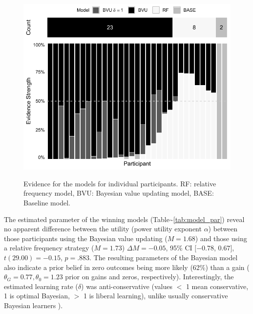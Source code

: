 \documentclass[a4paper, man, floatsintext]{apa6}
\begin{document}
\begin{figure}

{\centering \includegraphics{figures/model_weights-1}
}

\caption{Evidence for the models for individual participants. RF: relative frequency model, BVU: Bayesian value updating model, BASE: Baseline model.}\label{fig:model_weights}
\end{figure}

The estimated parameter of the winning models
(Table\textasciitilde{}\ref{tab:model_par}) reveal no apparent
difference between the utility (power utility exponent \(\alpha\))
between those participants using the Bayesian value updating
(\(M=1.68\)) and those using a relative frequency strategy (\(M=1.73\))
\(\Delta M = -0.05\), 95\% CI \([-0.78\), \(0.67]\),
\(t(29.00) = -0.15\), \(p = .883\). The resulting parameters of the
Bayesian model also indicate a prior belief in zero outcomes being more
likely (62\%) than a gain (\(\theta_G = 0.77, \theta_0 = 1.23\) prior on
gains and zeros, respectively). Interestingly, the estimated learning
rate (\(\delta\)) was anti-conservative (values \(<\) 1 mean
conservative, 1 is optimal Bayesian, \(>\) 1 is liberal learning),
unlike usually conservative Bayesian learners
\citep{Edwards1967,Tauber2017}).
\end{document}
